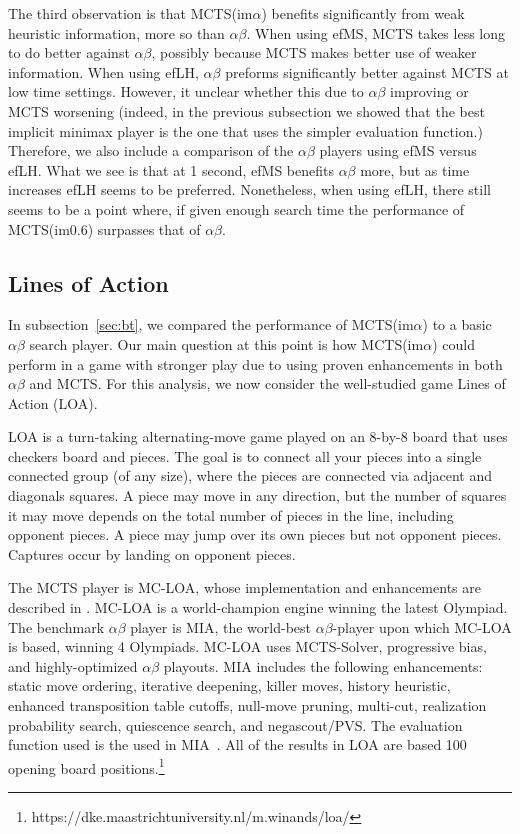 \documentclass[conference]{IEEEtran}
\begin{document}
The third observation is that MCTS(im$\alpha$) benefits significantly from weak 
heuristic information, more so than $\alpha\beta$. 
When using efMS, MCTS takes less long to do better against $\alpha\beta$, 
possibly because MCTS makes better use of weaker information. 
When using efLH, $\alpha\beta$ preforms significantly better against MCTS at low time settings.  
However, it unclear whether this due to $\alpha\beta$ improving or MCTS worsening (indeed, 
in the previous subsection we showed that the best implicit minimax player is the one that uses 
the simpler evaluation function.) Therefore, we also include a comparison of the $\alpha\beta$ players
using efMS versus efLH. What we see is that at 1 second, efMS benefits $\alpha\beta$ more, but as time 
increases efLH seems to be preferred. 
Nonetheless, when using efLH, there still seems to be a point where, if given enough search time
the performance of MCTS(im$0.6$) surpasses that of $\alpha\beta$. 

\subsection{Lines of Action}

In subsection~\ref{sec:bt}, we compared the performance of MCTS(im$\alpha$) to a basic $\alpha\beta$
search player. Our main question at this point is how MCTS(im$\alpha$) could perform in a game with 
stronger play due to using proven enhancements in both $\alpha\beta$ and MCTS.
For this analysis, we now consider the well-studied game Lines of Action (LOA). 

LOA is a turn-taking alternating-move game played on an 8-by-8 board that uses checkers board and pieces.
The goal is to connect all your pieces into a single connected group (of any size), 
where the pieces are connected via adjacent and diagonals squares. A piece may move in any direction, but the number of squares 
it may move depends on the total number of pieces in the line, including opponent pieces. A piece may jump over its own
pieces but not opponent pieces. Captures occur by landing on opponent pieces. 

The MCTS player is MC-LOA, whose implementation and enhancements are described in \cite{Winands10MCTS-LOA}. 
MC-LOA is a world-champion engine winning the latest Olympiad. The benchmark $\alpha\beta$ player is MIA, the world-best $\alpha\beta$-player 
upon which MC-LOA is based, winning 4 Olympiads. MC-LOA uses MCTS-Solver, progressive bias, and highly-optimized $\alpha\beta$
playouts. MIA includes the following enhancements: static move ordering, iterative deepening, killer moves, history heuristic, enhanced 
transposition table cutoffs, null-move pruning, multi-cut, realization probability search, quiescence search, and negascout/PVS. 
The evaluation function used is the used in MIA~\cite{Winands06MIA}.
All of the results in LOA are based 100 opening board 
positions.\footnote{\small https://dke.maastrichtuniversity.nl/m.winands/loa/} 
\end{document}

